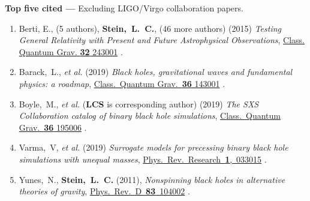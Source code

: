 		{\bf Top five cited ---}%
	Excluding LIGO/Virgo collaboration papers.
	\begin{enumerate}
		\item
		      Berti, E., (5 authors), {\bf Stein,~L.~C.}, (46 more authors)
		      (2015)
		      {\it Testing General Relativity with Present and Future
				      Astrophysical Observations},
		      \href{http://dx.doi.org/10.1088/0264-9381/32/24/243001}{Class. Quantum Grav. {\bf 32} 243001}
		      .
		\item
		      Barack,~L., {\it et al.}
		      (2019)
		      {\it Black holes, gravitational waves and fundamental physics: a roadmap},
		      \href{https://doi.org/10.1088/1361-6382/ab0587}{Class.~Quantum Grav.~{\bf 36} 143001}
		      .
		\item
		      Boyle,~M., {\it et al.} ({\bf LCS} is corresponding author)
		      (2019)
		      {\it The SXS Collaboration catalog of binary black hole simulations},
		      \href{https://doi.org/10.1088/1361-6382/ab34e2}{Class.~Quantum Grav.~{\bf 36} 195006}
		      .
		\item
		      Varma,~V, {\it et al.}
		      (2019)
		      {\it Surrogate models for precessing binary black hole simulations with
				      unequal masses},
		      \href{https://doi.org/10.1103/PhysRevResearch.1.033015}{Phys.~Rev.~Research~{\bf 1},~033015}
		      .
		\item
		      Yunes,~N., {\bf Stein,~L.~C.}
		      (2011),
		      {\it Nonspinning black holes in alternative theories of gravity},
		      \href{http://dx.doi.org/10.1103/PhysRevD.83.104002}{Phys.~Rev.~D~{\bf 83}~104002}
		      .
	\end{enumerate}
\else%
\fi

\renewcommand{\citeCount}[1]{}

